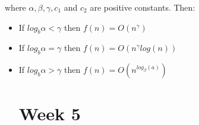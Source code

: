 \documentclass[5pt,a4paper]{article}
\begin{document}
\begin{multicols}{3}
where $\alpha, \beta, \gamma, c_1$ and $c_2$ are positive constants. Then:

\begin{itemize}
\item If $log_{b} \alpha < \gamma$ then $f(n) = O(n^\gamma)$
\item If $log_{b} \alpha = \gamma$ then $f(n) = O(n^\gamma log(n))$
\item If $log_{b} \alpha > \gamma$ then $f(n) = O(n^{log_\beta(a)})$

\section{Week 5}

\end{itemize}

\end{multicols}
\end{document}
